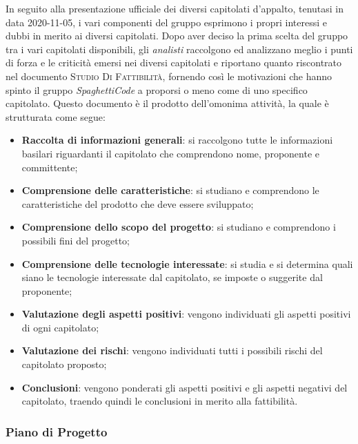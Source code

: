 In seguito alla presentazione ufficiale dei diversi capitolati d'appalto, tenutasi in data 2020-11-05, i vari componenti
del gruppo esprimono i propri interessi e dubbi in merito ai diversi capitolati.
Dopo aver deciso la prima scelta del gruppo tra i vari capitolati disponibili, gli \emph{analisti}
raccolgono ed analizzano meglio i punti di forza e le criticità emersi nei diversi capitolati e riportano quanto
riscontrato nel documento \textsc{Studio Di Fattibilità}, fornendo così le motivazioni che hanno spinto il gruppo
\emph{SpaghettiCode} a proporsi o meno come  di uno specifico capitolato. Questo documento è il
prodotto dell'omonima attività, la quale è strutturata come segue:
\begin{itemize}
    \item \textbf{Raccolta di informazioni generali}: si raccolgono tutte le informazioni basilari riguardanti il
    capitolato che comprendono nome, proponente e committente;
    \item \textbf{Comprensione delle caratteristiche}: si studiano e comprendono le caratteristiche del prodotto che
    deve essere sviluppato;
    \item \textbf{Comprensione dello scopo del progetto}: si studiano e comprendono i possibili fini del progetto;
    \item \textbf{Comprensione delle tecnologie interessate}: si studia e si determina quali siano le tecnologie
    interessate dal capitolato, se imposte o suggerite dal proponente;
    \item \textbf{Valutazione degli aspetti positivi}: vengono individuati gli aspetti positivi di ogni capitolato;
    \item \textbf{Valutazione dei rischi}: vengono individuati tutti i possibili rischi del capitolato proposto;
    \item \textbf{Conclusioni}: vengono ponderati gli aspetti positivi e gli aspetti negativi del capitolato, traendo
    quindi le conclusioni in merito alla fattibilità.
\end{itemize}

\subsubsection{Piano di Progetto}
\label{par:pdp}


